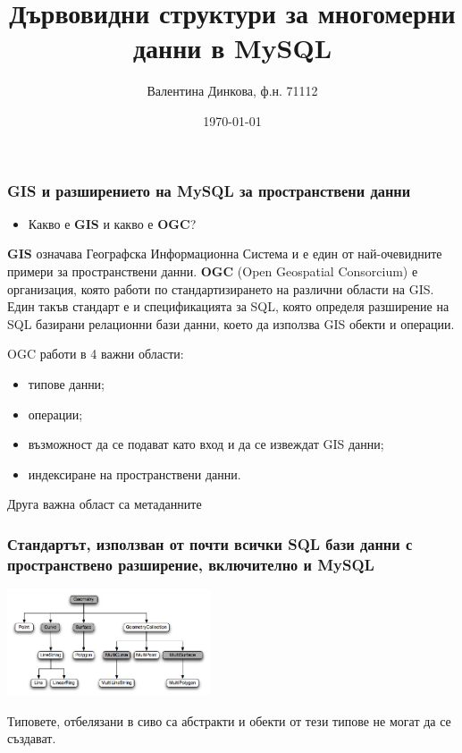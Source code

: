 \documentclass{beamer}
\title[Дървовидни структури за многомерни данни в MySQL]{Дървовидни структури за многомерни данни в MySQL}
\author{Валентина Динкова, ф.н. 71112}
\institute{ФМИ}
\date{\today}
\begin{document}
\begin{frame}
  \titlepage
\end{frame}

\begin{frame}
  \frametitle{GIS и разширението на MySQL за пространствени данни}
\begin{itemize}
 \item Какво е \textbf{GIS} и какво е \textbf{OGC}?
\end{itemize}
\textbf{GIS} означава Географска Информационна Система и е един от най-очевидните примери за пространствени данни.
\newline
\newline
\textbf{OGC} (Open Geospatial Consorcium) е организация, която работи по стандартизирането на различни области на GIS.
Един такъв стандарт е и спецификацията за SQL, която определя разширение на SQL базирани релационни бази данни, което да използва GIS обекти и операции.
\end{frame}

\begin{frame}
 OGC работи в 4 важни области:
\begin{itemize}
 \item типове данни;
 \item операции;
 \item възможност да се подават като вход и да се извеждат GIS данни;
 \item индексиране на пространствени данни.
\end{itemize}
Друга важна област са метаданните
\end{frame}

\begin{frame}
\frametitle{Стандартът, използван от почти всички SQL бази данни с пространствено разширение, включително и MySQL}
\begin{center}
\includegraphics[width=60mm]{gis-datatypes.png}\end{center}
Типовете, отбелязани в сиво са абстракти и обекти от тези типове не могат да се създават.
\end{frame}
\end{document}
